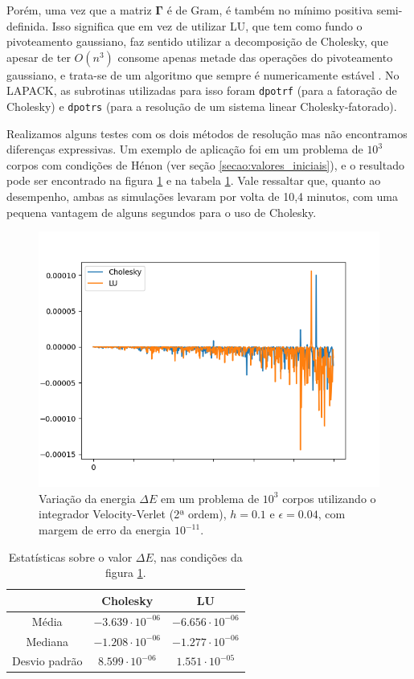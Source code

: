 Porém, uma vez que a matriz $\bm \Gamma$ é de Gram, é também no mínimo positiva semi-definida. Isso significa que em vez de utilizar LU, que tem como fundo o pivoteamento gaussiano, faz sentido utilizar a decomposição de Cholesky, que apesar de ter $O(n^3)$ consome apenas metade das operações do pivoteamento gaussiano, e trata-se de um algoritmo que sempre é numericamente estável \citep[172-177]{Trefethen1997}. No LAPACK, as subrotinas utilizadas para isso foram \verb|dpotrf| (para a fatoração de Cholesky) e \verb|dpotrs| (para a resolução de um sistema linear Cholesky-fatorado). 

Realizamos alguns testes com os dois métodos de resolução mas não encontramos diferenças expressivas. Um exemplo de aplicação foi em um problema de $10^3$ corpos com condições de Hénon (ver seção \ref{secao:valores_iniciais}), e o resultado pode ser encontrado na figura \ref{fig:corretor_cholesky_vs_lu_energia} e na tabela \ref{tab:corretor_cholesky_vs_lu_energia}. Vale ressaltar que, quanto ao desempenho, ambas as simulações levaram por volta de 10,4 minutos, com uma pequena vantagem de alguns segundos para o uso de Cholesky.

\begin{figure}
    \centering
    \includegraphics[width=0.5\linewidth]{tcc//img/exemplo_cholesky_vs_lu_energia.png}
    \caption{Variação da energia $\Delta E$ em um problema de $10^3$ corpos utilizando o integrador Velocity-Verlet (2ª ordem), $h=0.1$ e $\epsilon=0.04$, com margem de erro da energia $10^{-11}$.}
    \label{fig:corretor_cholesky_vs_lu_energia}
\end{figure}

\begin{table}[]
    \centering
    \begin{tabular}{c|cc}
                      & Cholesky     & LU           \\ \hline
        Média         & $-3.639 \cdot 10^{-06}$ & $-6.656 \cdot 10^{-06}$ \\
        Mediana       & $-1.208 \cdot 10^{-06}$ & $-1.277 \cdot 10^{-06}$ \\
        Desvio padrão & $8.599 \cdot 10^{-06}$  & $1.551 \cdot 10^{-05}$  
    \end{tabular}
    \caption{Estatísticas sobre o valor $\Delta E$, nas condições da figura \ref{fig:corretor_cholesky_vs_lu_energia}.}
    \label{tab:corretor_cholesky_vs_lu_energia}
\end{table}

